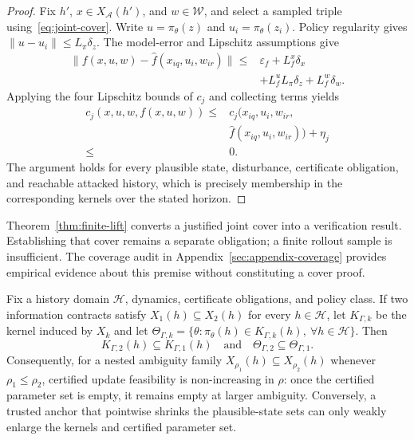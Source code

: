\begin{proof}
Fix $h'$, $x\in X_{\mathcal A}(h')$, and $w\in\mathcal W$, and select a
sampled triple using~\eqref{eq:joint-cover}.  Write
$u=\pi_\theta(z)$ and $u_i=\pi_\theta(z_i)$.  Policy regularity gives
$\|u-u_i\|\le L_\pi\delta_z$.  The model-error and Lipschitz assumptions give
\begin{equation}
\begin{split}
\|f(x,u,w)-\widehat f(x_{iq},u_i,w_{ir})\|
\le{}&\varepsilon_f+L_f^x\delta_x\\
&+L_f^uL_\pi\delta_z+L_f^w\delta_w .
\end{split}
\end{equation}
Applying the four Lipschitz bounds of $c_j$ and collecting terms yields
\begin{equation}
\begin{split}
c_j(x,u,w,f(x,u,w))
\le{}&c_j(x_{iq},u_i,w_{ir},\\
&\widehat f(x_{iq},u_i,w_{ir}))+\eta_j\\
\le{}&0.
\end{split}
\end{equation}
The argument holds for every plausible state, disturbance, certificate
obligation, and reachable attacked history, which is precisely membership in
the corresponding kernels over the stated horizon.
\end{proof}

Theorem~\ref{thm:finite-lift} converts a justified joint cover into a
verification result.  Establishing that cover remains a separate obligation;
a finite rollout sample is insufficient.  The coverage audit in
Appendix~\ref{sec:appendix-coverage} provides empirical evidence about this
premise without constituting a cover proof.

\begin{proposition}
\label{prop:plausible-monotonicity}
Fix a history domain $\mathcal H$, dynamics, certificate obligations, and
policy class.  If two information contracts satisfy
$X_1(h)\subseteq X_2(h)$ for every $h\in\mathcal H$, let
$K_{\Gamma,k}$ be the kernel induced by $X_k$ and let
$\Theta_{\Gamma,k}=\{\theta:\pi_\theta(h)\in K_{\Gamma,k}(h),
\ \forall h\in\mathcal H\}$.  Then
\begin{equation}
K_{\Gamma,2}(h)\subseteq K_{\Gamma,1}(h)
\quad\text{and}\quad
\Theta_{\Gamma,2}\subseteq\Theta_{\Gamma,1}.
\end{equation}
Consequently, for a nested ambiguity family
$X_{\rho_1}(h)\subseteq X_{\rho_2}(h)$ whenever $\rho_1\le\rho_2$, certified
update feasibility is non-increasing in $\rho$: once the certified parameter
set is empty, it remains empty at larger ambiguity.  Conversely, a trusted
anchor that pointwise shrinks the plausible-state sets can only weakly enlarge
the kernels and certified parameter set.
\end{proposition}

